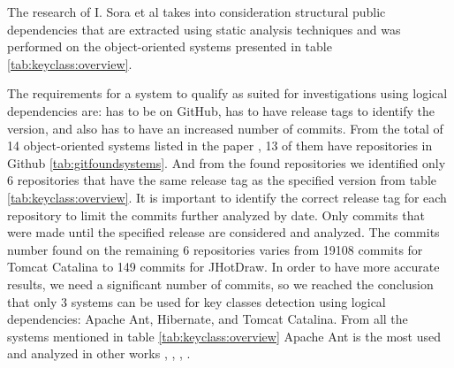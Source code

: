 \documentclass[12pt]{mitthesis}
\begin{document}
The research of I. Sora et al \cite{Finding-key-classes} takes into consideration structural public dependencies that are extracted using static analysis techniques and was performed on the object-oriented systems presented in table \ref{tab:keyclass:overview}.

The requirements for a system to qualify as suited for investigations using logical dependencies are: has to be on GitHub, has to have release tags to identify the version, and also has to have an increased number of commits. 
From the total of 14 object-oriented systems listed in the paper \cite{Finding-key-classes}, 13 of them have repositories in Github \ref{tab:gitfoundsystems}. And from the found repositories we identified only 6 repositories that have the same release tag as the specified version from table \ref{tab:keyclass:overview}. It is important to identify the correct release tag for each repository to limit the commits further analyzed by date. Only commits that were made until the specified release are considered and analyzed.
The commits number found on the remaining 6 repositories varies from 19108 commits for Tomcat Catalina to 149 commits for JHotDraw. In order to have more accurate results, we need a significant number of commits, so we reached the conclusion that only 3 systems can be used for key classes detection using logical dependencies: Apache Ant, Hibernate, and Tomcat Catalina.  From all the systems mentioned in table \ref{tab:keyclass:overview} Apache Ant is the most used and analyzed in other  works \cite{enase19}, \cite{7332515}, \cite{1402122}, \cite{Kamran2016IdentificationOC}.
\end{document}
